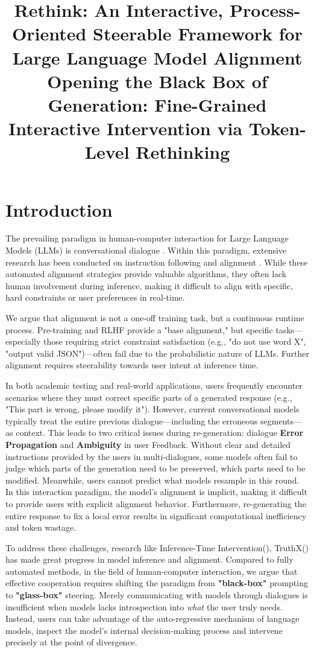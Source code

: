 \documentclass{article}
\title{Rethink: An Interactive, Process-Oriented Steerable Framework for Large Language Model Alignment \\
\large Opening the Black Box of Generation: Fine-Grained Interactive Intervention via Token-Level Rethinking}
\author{}
\date{}
\begin{document}
\maketitle

\section{Introduction}
\label{intro}
The prevailing paradigm in human-computer interaction for Large Language Models (LLMs) is conversational dialogue . Within this paradigm, extensive research has been conducted on instruction following and alignment . While these automated alignment strategies provide valuable algorithms, they often lack human involvement during inference, making it difficult to align with specific, hard constraints or user preferences in real-time.

We argue that alignment is not a one-off training task, but a continuous runtime process. Pre-training and RLHF provide a "base alignment," but specific tasks—especially those requiring strict constraint satisfaction (e.g., "do not use word X", "output valid JSON")—often fail due to the probabilistic nature of LLMs. Further alignment requires steerability towards user intent at inference time.


In both academic testing and real-world applications, users frequently encounter scenarios where they must correct specific parts of a generated response (e.g., "This part is wrong, please modify it"). However, current conversational models typically treat the entire previous dialogue—including the erroneous segments—as context. This leads to two critical issues during re-generation: dialogue \textbf{Error Propagation} and \textbf{Ambiguity} in user Feedback. Without clear and detailed instructions provided by the users in multi-dialogues, some models often fail to judge which parts of the generation need to be preserved, which parts need to be modified. Meanwhile, users cannot predict what models resample in this round. In this interaction paradigm, the model's alignment is implicit, making it difficult to provide users with explicit alignment behavior. Furthermore, re-generating the entire response to fix a local error results in significant computational inefficiency and token wastage.

To address these challenges, research like Inference-Time Intervention(), TruthX() has made great progress in model inference and alignment. Compared to fully automated methods, in the field of human-computer interaction, we argue that effective cooperation requires shifting the paradigm from \textbf{"black-box"} prompting to \textbf{"glass-box"} steering. Merely communicating with models through dialogues is insufficient when models lacks introspection into \textit{what} the user truly needs. Instead, users can take advantage of the auto-regressive mechanism of language models, inspect the model's internal decision-making process and intervene precisely at the point of divergence.
\end{document}
